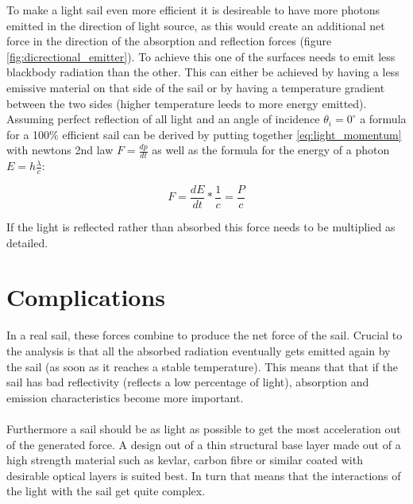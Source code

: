\documentclass[14pt]{article}
\begin{document}
To make a light sail even more efficient it is desireable to have more photons emitted in the direction of light source, as this would create an additional net force in the
direction of the absorption and reflection forces (figure \ref{fig:dicrectional_emitter}). To achieve this one of the surfaces needs to emit less blackbody radiation than
the other. This can either be achieved by having a less emissive material on that side of the sail or by having a temperature gradient between the two sides (higher temperature
leeds to more energy emitted).\\

Assuming perfect reflection of all light and an angle of incidence $\theta_i = 0^\circ$ a formula for a 100\% efficient sail can be derived
by putting together \ref{eq:light_momentum} with newtons 2nd law $F = \frac{dp}{dt}$ as well as the formula for the energy of a photon $ E = h \frac{\lambda}{c}$:

\begin{equation}
  F = \frac{dE}{dt} * \frac{1}{c} = \frac{P}{c}
  \label{eq:light_force}
\end{equation}

If the light is reflected rather than absorbed this force needs to be multiplied as detailed.


\section{Complications}

In a real sail, these forces combine to produce the net force of the sail. Crucial to the analysis is that all the absorbed radiation eventually gets emitted again
by the sail (as soon as it reaches a stable temperature). This means that that if the sail has bad reflectivity (reflects a low percentage of light), absorption and
emission characteristics become more important.\\
\\
Furthermore a sail should be as light as possible to get the most acceleration out of the generated force. A design out of a thin structural base layer made out
of a high strength material such as kevlar, carbon fibre or similar coated with desirable optical layers is suited best. In turn that means that the interactions
of the light with the sail get quite complex.\\
\end{document}
